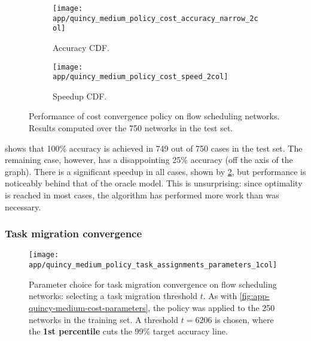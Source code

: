\begin{figure}
    \begin{widepage}
        \begin{subfigure}[c]{0.5\textwidth}
            \texttt{[image: app/quincy\_medium\_policy\_cost\_accuracy\_narrow\_2col]}
            \caption{Accuracy CDF.}
            \label{fig:app-quincy-medium-cost-cdf:accuracy}
        \end{subfigure}
        \begin{subfigure}[c]{0.5\textwidth}
            \texttt{[image: app/quincy\_medium\_policy\_cost\_speed\_2col]}
            \caption{Speedup CDF.}
            \label{fig:app-quincy-medium-cost-cdf:speedup}
        \end{subfigure}
    \end{widepage}
    \caption[Performance of cost convergence on flow scheduling networks]{Performance of cost convergence policy on flow scheduling networks. Results computed over the 750 networks in the test set.}
    \label{fig:app-quincy-medium-cost-cdf}
\end{figure}

 shows that 100\% accuracy is achieved in 749 out of 750 cases in the test set. The remaining case, however, has a disappointing 25\% accuracy (off the axis of the graph). There is a significant speedup in all cases, shown by \cref{fig:app-quincy-medium-cost-cdf:speedup}, but performance is noticeably behind that of the oracle model. This is unsurprising: since optimality is reached in most cases, the algorithm has performed more work than was necessary.

\subsubsection{Task migration convergence}

\begin{figure}
    \centering
    \texttt{[image: app/quincy\_medium\_policy\_task\_assignments\_parameters\_1col]}
    \caption[Parameter choice for task migration convergence with flow scheduling]{Parameter choice for task migration convergence on flow scheduling networks: selecting a task migration threshold $t$. As with \cref{fig:app-quincy-medium-cost-parameters}, the policy was applied to the 250 networks in the training set. A threshold $t=6206$ is chosen, where the \textbf{\color{matplotlib_blue} 1st percentile} cuts the 99\% target accuracy line.}
    \label{fig:app-quincy-medium-task-assignment-parameters}
\end{figure}

